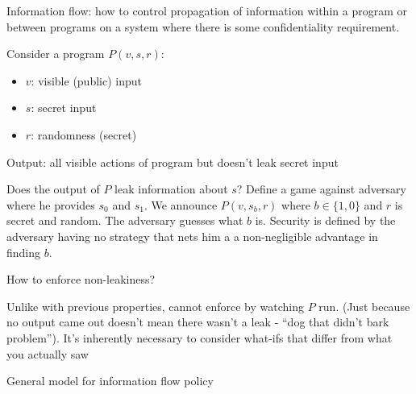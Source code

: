 
Information flow: how to control propagation of information within a program or
between programs on a system where there is some confidentiality requirement.

Consider a program $P(v, s, r)$:
\begin{itemize}
    \item $v$: visible (public) input
    \item $s$: secret input
    \item $r$: randomness (secret)
\end{itemize}
Output: all visible actions of program but doesn't leak secret input

Does the output of $P$ leak information about $s$? Define a game against
adversary where he provides $s_0$ and $s_1$. We announce $P(v, s_b, r)$ where $b \in \{1, 0\}$ and $r$ is secret and random. The adversary guesses what $b$ is. Security is defined by the adversary having no strategy that nets him a a non-negligible advantage in finding $b$.

How to enforce non-leakiness?

Unlike with previous properties, cannot enforce by watching $P$ run.
(Just because no output came out doesn't mean there wasn't a leak - ``dog that
didn't bark problem''). It's inherently necessary to consider what-ifs that
differ from what you actually saw

General model for information flow policy

